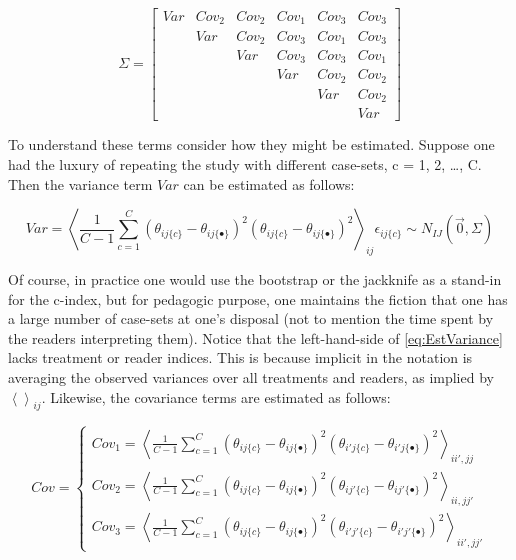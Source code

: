 \documentclass[
]{book}
\begin{document}
\[
\Sigma=
\begin{bmatrix}
Var & Cov_2 & Cov_2 & Cov_1 & Cov_3 & Cov_3 \\
 & Var & Cov_2 & Cov_3 & Cov_1 & Cov_3 \\ 
 &  & Var & Cov_3 & Cov_3 & Cov_1 \\ 
 &  &  & Var & Cov_2 & Cov_2 \\
 &  &  &  & Var & Cov_2 \\ 
 &  &  &  &  & Var
\end{bmatrix}
\]

To understand these terms consider how they might be estimated. Suppose one had the luxury of repeating the study with different case-sets, c = 1, 2, \ldots, C. Then the variance term \(Var\) can be estimated as follows:

\begin{equation}
Var=
\left \langle \frac{1}{C-1}\sum_{c=1}^{C} (\theta_{ij\{c\}}-\theta_{ij\{\bullet\}})^2 (\theta_{ij\{c\}}-\theta_{ij\{\bullet\}})^2 \right \rangle_{ij}
\epsilon_{ij\{c\}} \sim N_{IJ}(\vec{0},\Sigma)
\label{eq:EstVariance}
\end{equation}

Of course, in practice one would use the bootstrap or the jackknife as a stand-in for the c-index, but for pedagogic purpose, one maintains the fiction that one has a large number of case-sets at one's disposal (not to mention the time spent by the readers interpreting them). Notice that the left-hand-side of \eqref{eq:EstVariance} lacks treatment or reader indices. This is because implicit in the notation is averaging the observed variances over all treatments and readers, as implied by \(\left \langle \right \rangle _{ij}\). Likewise, the covariance terms are estimated as follows:

\begin{equation}
Cov=\left\{\begin{matrix}
Cov_1=\left \langle \frac{1}{C-1}\sum_{c=1}^{C} (\theta_{ij\{c\}}-\theta_{ij\{\bullet\}})^2 (\theta_{i'j\{c\}}-\theta_{i'j\{\bullet\}})^2 \right \rangle_{ii',jj}\\ 
Cov_2=\left \langle \frac{1}{C-1}\sum_{c=1}^{C} (\theta_{ij\{c\}}-\theta_{ij\{\bullet\}})^2 (\theta_{ij'\{c\}}-\theta_{ij'\{\bullet\}})^2 \right \rangle_{ii,jj'}\\ 
Cov_3=\left \langle \frac{1}{C-1}\sum_{c=1}^{C} (\theta_{ij\{c\}}-\theta_{ij\{\bullet\}})^2 (\theta_{i'j'\{c\}}-\theta_{i'j'\{\bullet\}})^2 \right \rangle_{ii',jj'}
\end{matrix}\right.
\label{eq:EstCov}
\end{equation}
\end{document}
